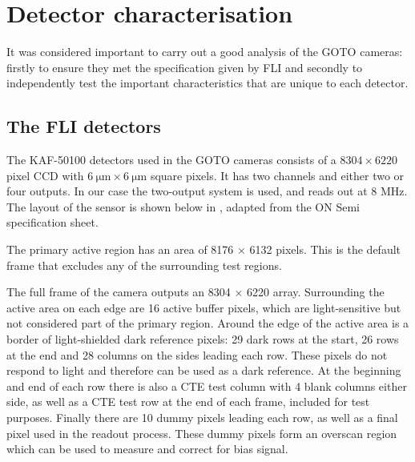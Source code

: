 \section{Detector characterisation}
\label{sec:detectors}
\begin{colsection}


\begin{colsection}
It was considered important to carry out a good analysis of the GOTO cameras: firstly to ensure they met the specification given by FLI and secondly to independently test the important characteristics that are unique to each detector.


\end{colsection}

\newpage
\subsection{The FLI detectors}
\label{sec:FLI}
\begin{colsection}

The KAF-50100 detectors used in the GOTO cameras consists of a $8304 \times 6220$ pixel CCD with $\SI{6}{\micro\metre} \times \SI{6}{\micro\metre}$ square pixels. It has two channels and either two or four outputs. In our case the two-output system is used, and reads out at 8 MHz. The layout of the sensor is shown below in , adapted from the ON Semi specification sheet.

The primary active region has an area of 8176 $\times$ 6132 pixels. This is the default frame that excludes any of the surrounding test regions.

The full frame of the camera outputs an 8304 $\times$ 6220 array. Surrounding the active area on each edge are 16 active buffer pixels, which are light-sensitive but not considered part of the primary region. Around the edge of the active area is a border of light-shielded dark reference pixels: 29 dark rows at the start, 26 rows at the end and 28 columns on the sides leading each row. These pixels do not respond to light and therefore can be used as a dark reference. At the beginning and end of each row there is also a CTE test column with 4 blank columns either side, as well as a CTE test row at the end of each frame, included for test purposes. Finally there are 10 dummy pixels leading each row, as well as a final pixel used in the readout process. These dummy pixels form an overscan region which can be used to measure and correct for bias signal.


\end{colsection}
\end{colsection}
